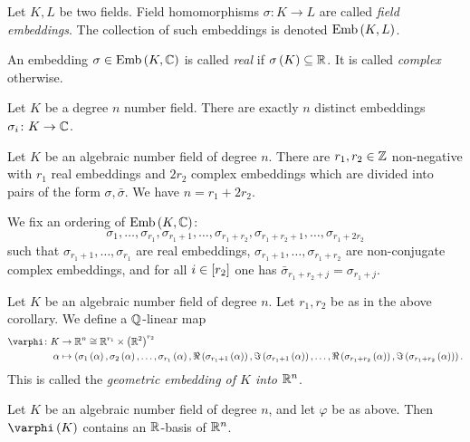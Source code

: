 \documentclass[11pt]{karticle}
\begin{document}
\begin{definition}
Let $K,L$ be two fields. Field homomorphisms $\sigma \colon K \to L$ are called \emph{field embeddings}.
The collection of such embeddings is denoted
$\mathrm{Emb}\left( K,L \right)$.
\end{definition}

\begin{definition}
An embedding $\sigma \in \mathrm{Emb}\left( K,\mathbb{C} \right)$ is called \emph{real} if $\sigma\left( K \right) \subseteq \mathbb{R}$.
It is called \emph{complex} otherwise.
\end{definition}

\begin{theorem}
Let $K$ be a degree $n$ number field. There are exactly $n$ distinct embeddings $\sigma_i \colon K \to \mathbb{C}$.
\end{theorem}

\begin{corollary}
Let $K$ be an algebraic number field of degree $n$.
There are $r_1, r_2 \in \mathbb{Z}$ non-negative with $r_1$ real embeddings and $2 r_2$ complex embeddings which are divided into pairs of the form $\sigma, \bar{\sigma}$. We have $n = r_1 + 2 r_2$.

We fix an ordering of $\mathrm{Emb}\left( K,\mathbb{C} \right)$:
\[\sigma_1, \ldots, \sigma_{r_1}, \sigma_{r_1 + 1}, \ldots, \sigma_{r_1 + r_2}, \sigma_{r_1 + r_2 + 1}, \ldots, \sigma_{r_1 + 2 r_2}\]
such that $\sigma_{r_1 + 1}, \ldots, \sigma_{r_1}$ are real embeddings, $\sigma_{r_1 + 1}, \ldots, \sigma_{r_1 + r_2}$ are non-conjugate complex embeddings, and for all $i \in \left[ r_2 \right]$ one has $\bar{\sigma}_{r_1 + r_2 + j} = \sigma_{r_1 + j}$.
\end{corollary}

\begin{definition}
Let $K$ be an algebraic number field of degree $n$. Let $r_1, r_2$ be as in the above corollary.
We define a $\mathbb{Q}$-linear map
\begin{align*}
\varphi \colon K &\to \mbb{R}^n \cong \mbb{R}^{r_1} \times \prs{\mbb{R}^2}^{r_2} \\
\alpha &\mapsto \prs{\sigma_1\prs{\alpha}, \sigma_2\prs{\alpha}, \ldots, \sigma_{r_1}\prs{\alpha}, \Re\prs{\sigma_{r_1 + 1}\prs{\alpha}}, \Im\prs{\sigma_{r_1 + 1}\prs{\alpha}}, \ldots, \Re\prs{\sigma_{r_1 + r_2}\prs{\alpha}}, \Im\prs{\sigma_{r_1 + r_2}\prs{\alpha}}} \text{.}
\end{align*}
This is called the \emph{geometric embedding of $K$ into $\mathbb{R}^n$}.
\end{definition}

\begin{proposition}
Let $K$ be an algebraic number field of degree $n$, and let $\varphi$ be as above. Then $\varphi\prs{K}$ contains an $\mathbb{R}$-basis of $\mathbb{R}^n$.
\end{proposition}


\printbibliography
\end{document}
